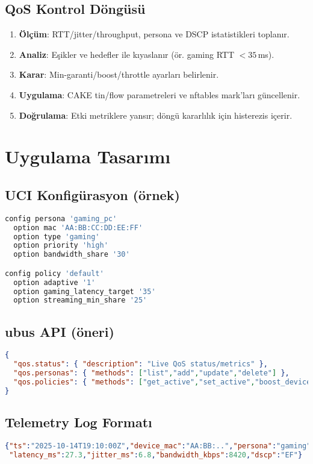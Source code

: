 \documentclass[11pt,a4paper]{article}
\begin{document}
\subsection{QoS Kontrol Döngüsü}
\begin{enumerate}
  \item \textbf{Ölçüm}: RTT/jitter/throughput, persona ve DSCP istatistikleri toplanır.
  \item \textbf{Analiz}: Eşikler ve hedefler ile kıyaslanır (ör. gaming RTT $<\!35$\,ms).
  \item \textbf{Karar}: Min-garanti/boost/throttle ayarları belirlenir.
  \item \textbf{Uygulama}: CAKE tin/flow parametreleri ve nftables mark'ları güncellenir.
  \item \textbf{Doğrulama}: Etki metriklere yansır; döngü kararlılık için histerezis içerir.
\end{enumerate}

\section{Uygulama Tasarımı}
\subsection{UCI Konfigürasyon (örnek)}
\begin{lstlisting}[language=bash,caption={/etc/config/qosd örnek şema}]
config persona 'gaming_pc'
  option mac 'AA:BB:CC:DD:EE:FF'
  option type 'gaming'
  option priority 'high'
  option bandwidth_share '30'

config policy 'default'
  option adaptive '1'
  option gaming_latency_target '35'
  option streaming_min_share '25'
\end{lstlisting}

\subsection{ubus API (öneri)}
\begin{lstlisting}[language=json,caption={ubus API yüzeyi (öneri)}]
{
  "qos.status": { "description": "Live QoS status/metrics" },
  "qos.personas": { "methods": ["list","add","update","delete"] },
  "qos.policies": { "methods": ["get_active","set_active","boost_device"] }
}
\end{lstlisting}

\subsection{Telemetry Log Formatı}
\begin{lstlisting}[language=json,caption={qosd JSON telemetri satırı (newline-delimited)}]
{"ts":"2025-10-14T19:10:00Z","device_mac":"AA:BB:..","persona":"gaming",
 "latency_ms":27.3,"jitter_ms":6.8,"bandwidth_kbps":8420,"dscp":"EF"}
\end{lstlisting}
\end{document}
